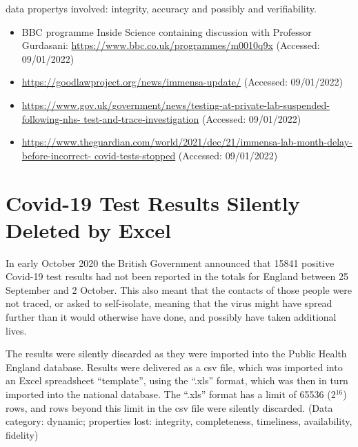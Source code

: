 \Glspl{data property} involved: \gls{integrity}, \gls{accuracy} and possibly  and \gls{verifiability}.

\begin{itemize}
  \item BBC programme Inside Science containing discussion with Professor Gurdasani: \href{https://www.bbc.co.uk/programmes/m0010q9x}{https://www.bbc.co.uk/programmes/m0010q9x} (Accessed: 09/01/2022)
  \item\href{https://goodlawproject.org/news/immensa-update/}{https://goodlawproject.org/news/immensa-update/} (Accessed: 09/01/2022)
  \item\href{https://www.gov.uk/government/news/testing-at-private-lab-suspended-following-nhs-test-and-trace-investigation}{https://www.gov.uk/government/news/testing-at-private-lab-suspended-following-nhs- test-and-trace-investigation} (Accessed: 09/01/2022)
  \item\href{https://www.theguardian.com/world/2021/dec/21/immensa-lab-month-delay-before-incorrect-covid-tests-stopped}{https://www.theguardian.com/world/2021/dec/21/immensa-lab-month-delay-before-incorrect- covid-tests-stopped} (Accessed: 09/01/2022)
\end{itemize}

\section{Covid-19 Test Results Silently Deleted by Excel} \label{bkm:incacc:covidexcel}

In early October 2020 the British Government announced that 15841 positive Covid-19 test results had not been reported in the totals for England between 25 September and 2 October. This also meant that the contacts of those people were not traced, or asked to self-isolate, meaning that the virus might have spread further than it would otherwise have done, and possibly have taken additional lives.

The results were silently discarded as they were imported into the Public Health England \gls{database}. Results were delivered as a \gls{csv} file, which was imported into an Excel spreadsheet ``template'', using the ``.xls'' format, which was then in turn imported into the national \gls{database}. The ``.xls'' format has a limit of 65536 (2$^{16}$) rows, and rows beyond this limit in the \gls{csv} file were silently discarded. (Data category: dynamic; properties lost: \gls{integrity}, \gls{completeness}, \gls{timeliness}, \gls{availability}, \gls{fidelity})

